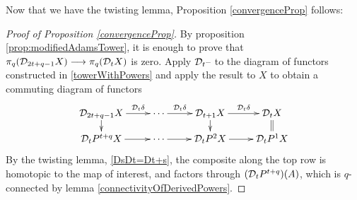 \documentclass[11pt]{amsart}
\theoremstyle{plain}
\newcommand{\caldup}[1]{\calD_{\smash{#1}}}
\begin{document}
Now that we have the twisting lemma, Proposition \ref{convergenceProp} follows:
\begin{proof}[Proof of Proposition \ref{convergenceProp}]
By proposition \ref{prop:modifiedAdamsTower}, it is enough to prove that $\pi_q(\caldup{2t+q-1}X)\to\pi_q(\caldup{t}X)$ is zero.
Apply $\caldup{t}\DASH$ to the diagram of functors constructed in \ref{towerWithPowers} and apply the result to $X$ to obtain a commuting diagram of functors
\[\xymatrix@R=4mm{
\caldup{2t+q-1}X
\ar[r]^-{\caldup{t}\delta}
\ar[d]
&
\cdots \ar[r]^-{\caldup{t}\delta}
&%
\caldup{t+1}X
\ar[r]^-{\caldup{t}\delta}
\ar[d]&%
\caldup{t}X
\ar@{=}[d]
\\%
\caldup{t}P^{t+q}X
\ar[r]
&%
\cdots 
\ar[r]&%
\caldup{t}P^2X
\ar[r]
&%
\caldup{t}P^1X%
}\]
By the twisting lemma, \ref{DsDt=Dt+s}, the composite along the top row is homotopic to the map of interest, and factors through $(\caldup{t}P^{t+q})(A)$, which is $q$-connected by lemma \ref{connectivityOfDerivedPowers}.
\end{proof}







\appendix
\end{document}
